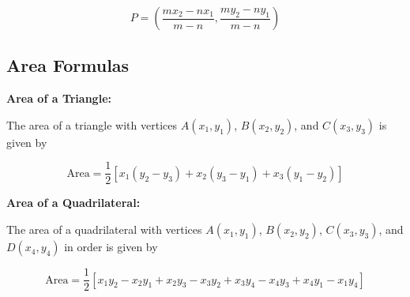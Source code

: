 \documentclass{article}
\begin{document}
\begin{equation}
P = \left(\frac{m x_2 - n x_1}{m - n}, \frac{m y_2 - n y_1}{m - n}\right)
\end{equation}

\subsection{Area Formulas}

\textbf{Area of a Triangle:}

The area of a triangle with vertices \(A(x_1, y_1)\), \(B(x_2, y_2)\), and \(C(x_3, y_3)\) is given by

\begin{equation}
\text{Area} = \frac{1}{2} [x_1(y_2 - y_3) + x_2 (y_3 - y_1) + x_3 (y_1 - y_2)]
\end{equation}

\textbf{Area of a Quadrilateral:}

The area of a quadrilateral with vertices \(A(x_1, y_1)\), \(B(x_2, y_2)\), \(C(x_3, y_3)\), and \(D(x_4, y_4)\) in order is given by

\begin{equation}
\text{Area} = \frac{1}{2} [x_1y_2 - x_2y_1 + x_2y_3 - x_3y_2 + x_3y_4 - x_4y_3 + x_4y_1 - x_1y_4]
\end{equation}
\end{document}

